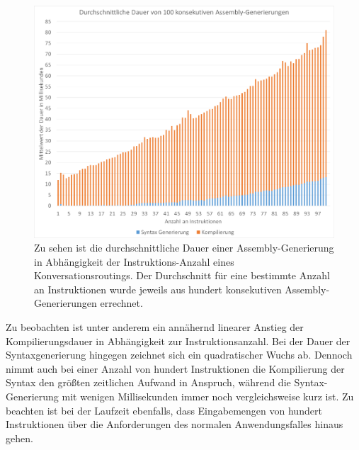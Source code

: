 \begin{figure} %
	\centering
		\includegraphics[width=\textwidth]{img/AverageTimeDiagram.png}
	\caption[Durchschnittliche Dauer von Assembly-Generierungen]{Zu sehen ist die durchschnittliche Dauer einer Assembly-Generierung in Abhängigkeit der Instruktions-Anzahl eines Konversationsroutings. Der Durchschnitt für eine bestimmte Anzahl an Instruktionen wurde jeweils aus hundert konsekutiven Assembly-Generierungen errechnet.}
	\label{fig:AverageTimeDiagram}
\end{figure}

Zu beobachten ist unter anderem ein annähernd linearer Anstieg der Kompilierungsdauer in Abhängigkeit zur Instruktionsanzahl. Bei der Dauer der Syntaxgenerierung hingegen zeichnet sich ein quadratischer Wuchs ab. Dennoch nimmt auch bei einer Anzahl von hundert Instruktionen die Kompilierung der Syntax den größten zeitlichen Aufwand in Anspruch, während die Syntax-Generierung mit wenigen Millisekunden immer noch vergleichsweise kurz ist. Zu beachten ist bei der Laufzeit ebenfalls, dass Eingabemengen von hundert Instruktionen über die Anforderungen des normalen Anwendungsfalles hinaus gehen.